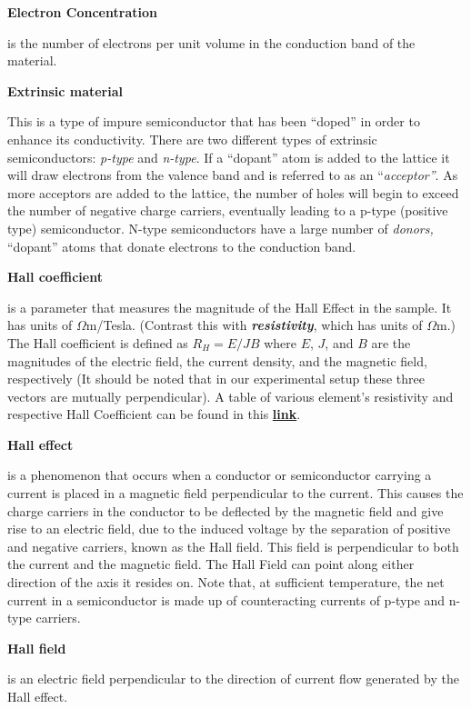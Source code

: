 \documentclass{../lab}
\begin{document}
\textbf{Electron Concentration}

is the number of electrons per unit volume in the conduction band of the material.

\textbf{Extrinsic material}

This is a type of impure semiconductor that has been ``doped'' in order to enhance its conductivity. There are two different types of extrinsic semiconductors: \emph{p-type} and \emph{n-type}. If a ``dopant'' atom is added to the lattice it will draw electrons from the valence band and is referred to as an ``\emph{acceptor''}. As more acceptors are added to the lattice, the number of holes will begin to exceed the number of negative charge carriers, eventually leading to a p-type (positive type) semiconductor. N-type semiconductors have a large number of\emph{ donors,} ``dopant'' atoms that donate electrons to the conduction band.

\textbf{Hall coefficient}

is a parameter that measures the magnitude of the Hall Effect in the sample. It has units of $\Omega$m/Tesla. (Contrast this with \emph{\textbf{resistivity}}, which has units of $\Omega$m.) The Hall coefficient is defined as $R_H = E/JB $  where $E$, $J$, and $B$ are the magnitudes of the electric field, the current density, and the magnetic field, respectively (It should be noted that in our experimental setup these three vectors are mutually perpendicular). A table of various element's resistivity and respective Hall Coefficient can be found in this \href{http://experimentationlab.berkeley.edu/sites/default/files/SHE/tableforRH.png}{\textbf{link}}.

\textbf{Hall effect}

is a phenomenon that occurs when a conductor or semiconductor carrying a current is placed in a magnetic field perpendicular to the current. This causes the charge carriers in the conductor to be deflected by the magnetic field and give rise to an electric field, due to the induced voltage by the separation of positive and negative carriers, known as the Hall field. This field is perpendicular to both the current and the magnetic field. The Hall Field can point along either direction of the axis it resides on. Note that, at sufficient temperature, the net current in a semiconductor is made up of counteracting currents of p-type and n-type carriers.

\textbf{Hall field}

is an electric field perpendicular to the direction of current flow generated by the Hall effect.
\end{document}
